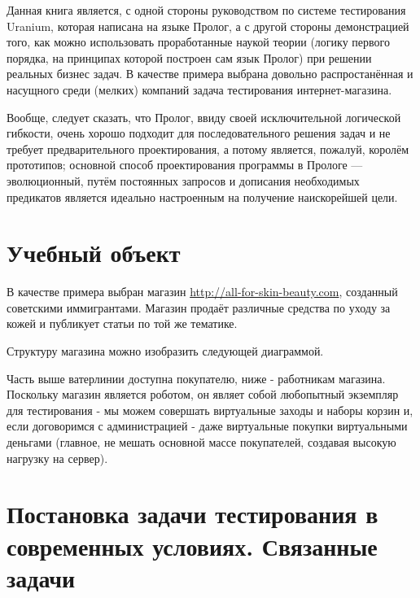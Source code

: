 \documentclass[a4paper]{book}
\def\ur{Uranium}
\begin{document}
Данная книга является, с одной стороны руководством по системе
тестирования \ur, которая написана на языке Пролог, а с другой
стороны демонстрацией того, как можно использовать проработанные
наукой теории (логику первого порядка, на принципах которой
построен сам язык Пролог) при решении реальных бизнес задач. В
качестве примера выбрана довольно распростанённая и насущного
среди (мелких) компаний задача тестирования интернет-магазина.

Вообще, следует сказать, что Пролог, ввиду своей исключительной
логической гибкости, очень хорошо подходит для последовательного
решения задач и не требует предварительного проектирования, а
потому является, пожалуй, королём прототипов; основной способ
проектирования программы в Прологе --- эволюционный, путём
постоянных запросов и дописания необходимых предикатов является
идеально настроенным на получение наискорейшей цели.

\section{Учебный объект}

В качестве примера выбран магазин
\url{http://all-for-skin-beauty.com}, созданный советскими
иммигрантами. Магазин продаёт различные средства по уходу за
кожей и публикует статьи по той же тематике.

Структуру магазина можно изобразить следующей диаграммой.

Часть выше ватерлинии доступна покупателю, ниже - работникам
магазина. Поскольку магазин является роботом, он являет собой
любопытный экземпляр для тестирования - мы можем совершать
виртуальные заходы и наборы корзин и, если договоримся с
администрацией - даже виртуальные покупки виртуальными деньгами
(главное, не мешать основной массе покупателей, создавая высокую
нагрузку на сервер).


\section{Постановка задачи тестирования в современных условиях. 
         Связанные задачи}
\end{document}
